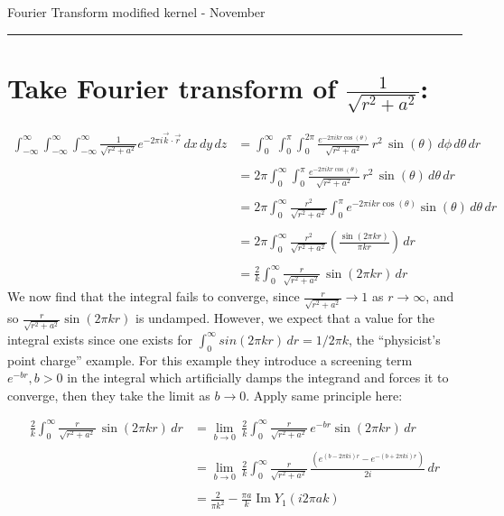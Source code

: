 \documentclass[letterpaper,10pt]{article}
\begin{document}
\begin{flushright}
{\Large Fourier Transform modified kernel - November}
\end{flushright}
\vskip -0.1in
\hrule
\vskip 0.4in

\vskip 0.1in
\section*{Take Fourier transform of $\frac{1}{\sqrt{r^2+a^2}}$:}

\begin{align*}
\int_{-\infty}^\infty\int_{-\infty}^\infty\int_{-\infty}^\infty \frac{1}{\sqrt{r^2+a^2}}e^{-2 \pi i\vec k\cdot \vec r }\,dx\,dy\,dz&=
\int_0^\infty\int_0^\pi \int_0^{2\pi} \frac{e^{-2 \pi ikr\cos(\theta)}}{\sqrt{r^2+a^2}}\,r^2\,\sin(\theta)\,d\phi\,d\theta\,dr\\\\
&=2\pi \int_0^\infty \int_0^\pi \frac{e^{-2 \pi ikr\cos(\theta)}}{\sqrt{r^2+a^2}}\,r^2\,\sin(\theta)\,d\theta\,dr\\\\
&=2\pi \int_0^\infty \frac{r^2}{\sqrt{r^2+a^2}} \int_0^\pi  e^{-2 \pi ikr\cos(\theta)}\sin(\theta)\,d\theta\,dr\,\\\\
&=2\pi \int_0^\infty \frac{r^2}{\sqrt{r^2+a^2}}\left(\frac{\sin(2\pi kr)}{\pi k r}\right)\,dr\\\\
&=\frac{2}{k} \int_0^\infty \frac{r}{\sqrt{r^2+a^2}}\,\sin(2\pi kr)\,dr
\end{align*}
We now find that the integral fails to converge, since $\frac{r}{\sqrt{r^2+a^2}} \to 1$ as $r \to \infty$, and so $\frac{r}{\sqrt{r^2+a^2}} \sin(2\pi kr)$ is undamped. However, we expect that a value for the integral exists since one exists for $\int_0^\infty sin(2 \pi kr) \,dr = 1/2 \pi k $, the ``physicist's point charge'' example. For this example they introduce a screening term $e^{-br}, b>0$ in the integral which artificially damps the integrand and forces it to converge, then they take the limit as $b\rightarrow 0$. Apply same principle here:

\begin{align*}
\frac{2}{k} \int_0^\infty \frac{r}{\sqrt{r^2+a^2}}\,\sin(2\pi kr)\,dr &= \lim_{b \to 0}\, \frac{2}{k} \int_0^\infty \frac{r}{\sqrt{r^2+a^2}}\,e^{-b r}\sin(2\pi kr)\,dr\\\\
&= \lim_{b \to 0}\, \frac{2}{k} \int_0^\infty \frac{r}{\sqrt{r^2+a^2}}\, \frac{( e^{(b - 2 \pi k i)r} - e^{-(b + 2 \pi k i)r})}{2 i}\, dr\\\\
&= \frac{2}{\pi k^2} - \frac{\pi a}{k} \operatorname{Im}Y_1(i 2 \pi a k)
\end{align*}
\end{document}
